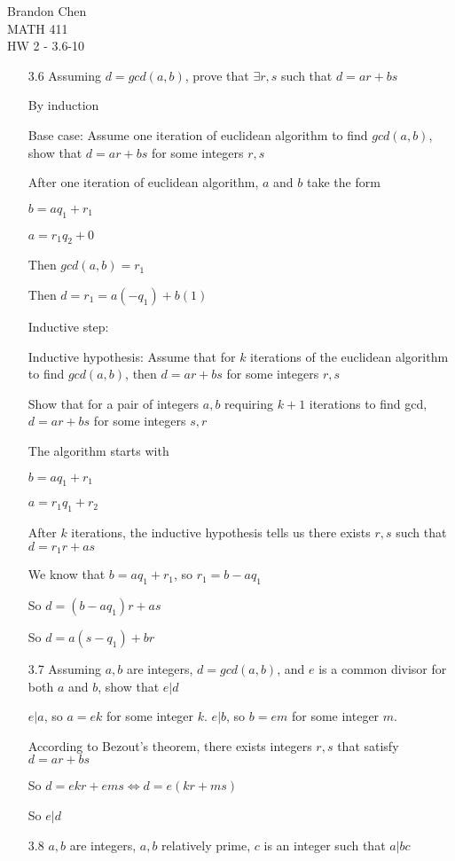 \documentclass[11pt]{article}
\begin{document}
\noindent Brandon Chen \\
MATH 411 \\
HW 2 - 3.6-10


\begin{itemize}
\item[3.6]
  Assuming $d = gcd(a,b)$, prove that $\exists r,s$ such that $d = ar + bs$

  By induction

  Base case: Assume one iteration of euclidean algorithm to find $gcd(a,b)$, show that $d = ar + bs$ for some integers $r,s$

  After one iteration of euclidean algorithm, $a$ and $b$ take the form

  $b = aq_1 + r_1$

  $a = r_1q_2 + 0$

  Then $gcd(a,b) = r_1$

  Then $d = r_1 = a(-q_1) + b(1)$

  Inductive step:

  Inductive hypothesis: Assume that for $k$ iterations of the euclidean algorithm to find $gcd(a,b)$, then $d = ar + bs$ for some integers $r,s$

  Show that for a pair of integers $a,b$ requiring $k + 1$ iterations to find gcd, $d = ar + bs$ for some integers $s,r$

  The algorithm starts with

  $b = aq_1 + r_1$

  $a = r_1q_1 + r_2$

  After $k$ iterations, the inductive hypothesis tells us there exists $r,s$ such that $d = r_1r + as$

  We know that $b = aq_1 + r_1$, so $r_1 = b - aq_1$

  So $d = (b- aq_1)r + as$

  So $d = a(s - q_1) + br$ 

\item[3.7]
  Assuming $a, b$ are integers, $d = gcd(a,b)$, and $e$ is a common divisor for both $a$ and $b$, show that $e | d$

  $e | a$, so $a = ek$ for some integer $k$. $e | b$, so $b = em$ for some integer $m$.

  According to Bezout's theorem, there exists integers $r, s$ that satisfy $d = ar + bs$

  So $d = ekr + ems \iff d = e(kr + ms)$

  So $e | d$
\item[3.8]
  $a, b$ are integers, $a,b$ relatively prime, $c$ is an integer such that $a | bc$


\end{itemize}
\end{document}
